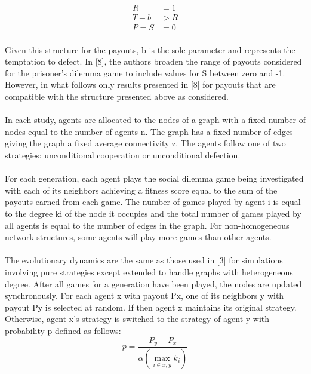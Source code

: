 \documentclass{article}
\begin{document}
    \begin{align}
    	R&=1\\
    	T-b&>R\\
    	P=S&=0
    \end{align}

    \paragraph{}Given this structure for the payouts, b is the sole parameter and represents the temptation to defect.  In [8], the authors broaden the range of payouts considered for the prisoner’s dilemma game to include values for S between zero and -1.  However, in what follows only results presented in [8] for payouts that are compatible with the structure presented above as considered.
    \paragraph{}In each study, agents are allocated to the nodes of a graph with a fixed number of nodes equal to the number of agents n.  The graph has a fixed number of edges giving the graph a fixed average connectivity z.  The agents follow one of two strategies: unconditional cooperation or unconditional defection.
    \paragraph{}For each generation, each agent plays the social dilemma game being investigated with each of its neighbors achieving a fitness score equal to the sum of the payouts earned from each game.  The number of games played by agent i is equal to the degree ki of the node it occupies and the total number of games played by all agents is equal to the number of edges in the graph.  For non-homogeneous network structures, some agents will play more games than other agents.
    \paragraph{}The evolutionary dynamics are the same as those used in [3] for simulations involving pure strategies except extended to handle graphs with heterogeneous degree.  After all games for a generation have been played, the nodes are updated synchronously.  For each agent x with payout Px, one of its neighbors y with payout Py is selected at random.  If  then agent x maintains its original strategy.  Otherwise, agent x’s strategy is switched to the strategy of agent y with probability p defined as follows:
    \begin{equation}
    	p=\frac{P_y-P_x}{\alpha\left(\max_{i\in{x,y}}k_i\right)}
    \end{equation}
\end{document}
